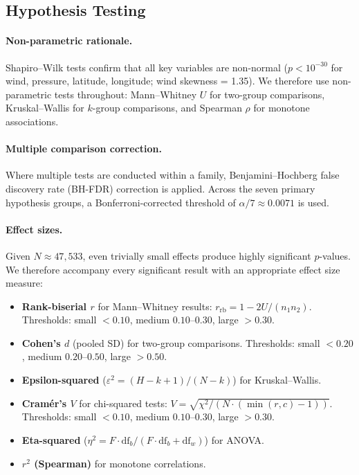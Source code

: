 \documentclass[12pt,a4paper]{article}
\begin{document}
\subsection{Hypothesis Testing}
\label{sec:hyp_methods}

\paragraph{Non-parametric rationale.} Shapiro--Wilk tests confirm that all
key variables are non-normal ($p < 10^{-30}$ for wind, pressure, latitude,
longitude; wind skewness = 1.35).
We therefore use non-parametric tests throughout: Mann--Whitney $U$ for
two-group comparisons, Kruskal--Wallis for $k$-group comparisons, and
Spearman $\rho$ for monotone associations.

\paragraph{Multiple comparison correction.} Where multiple tests are conducted
within a family, Benjamini--Hochberg false discovery rate (BH-FDR) correction
is applied.
Across the seven primary hypothesis groups, a Bonferroni-corrected threshold
of $\alpha/7 \approx 0.0071$ is used.

\paragraph{Effect sizes.} Given $N \approx 47{,}533$, even trivially small
effects produce highly significant $p$-values.
We therefore accompany every significant result with an appropriate effect size
measure:
\begin{itemize}
  \item \textbf{Rank-biserial $r$} for Mann--Whitney results:
        $r_\text{rb} = 1 - 2U/(n_1 n_2)$.
        Thresholds: small $< 0.10$, medium $0.10$--$0.30$, large $> 0.30$.
  \item \textbf{Cohen's $d$} (pooled SD) for two-group comparisons.
        Thresholds: small $< 0.20$, medium $0.20$--$0.50$, large $> 0.50$.
  \item \textbf{Epsilon-squared} ($\varepsilon^2 = (H - k + 1)/(N - k)$)
        for Kruskal--Wallis.
  \item \textbf{Cram\'er's $V$} for chi-squared tests:
        $V = \sqrt{\chi^2 / (N \cdot (\min(r,c)-1))}$.
        Thresholds: small $< 0.10$, medium $0.10$--$0.30$, large $> 0.30$.
  \item \textbf{Eta-squared} ($\eta^2 = F \cdot \text{df}_b / (F \cdot \text{df}_b + \text{df}_w)$)
        for ANOVA.
  \item \textbf{$r^2$ (Spearman)} for monotone correlations.
\end{itemize}
\end{document}
